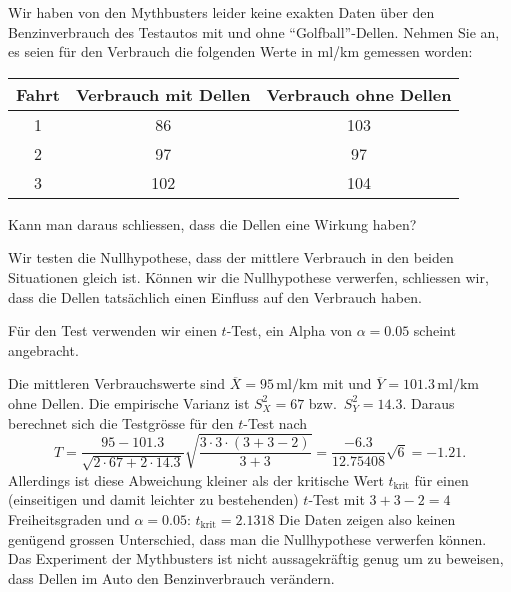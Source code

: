 Wir haben von den Mythbusters leider keine exakten Daten über den
Benzinverbrauch des Testautos mit und ohne ``Golfball''-Dellen.
Nehmen Sie an, es seien für den Verbrauch die folgenden Werte in ml/km
gemessen worden:
\begin{center}
\begin{tabular}{ccc}
\hline
Fahrt&Verbrauch mit Dellen&Verbrauch ohne Dellen\\
\hline
1&86&103\\
2&97&97\\
3&102&104\\
\hline
\end{tabular}
\end{center}
Kann man daraus schliessen, dass die Dellen eine Wirkung haben?


\begin{loesung}
Wir testen die Nullhypothese, dass der mittlere Verbrauch in den
beiden Situationen gleich ist.
Können wir die Nullhypothese verwerfen, schliessen wir, dass die
Dellen tatsächlich einen Einfluss auf den Verbrauch haben.

Für den Test verwenden wir einen $t$-Test, ein Alpha von
$\alpha=0.05$ scheint angebracht.

Die mittleren Verbrauchswerte sind $\overline X=95\,\text{ml/km}$ mit und
$\overline{Y}=101.3\,\text{ml/km}$ ohne Dellen.
Die empirische Varianz ist $S_X^2 = 67$ bzw.~$S_Y^2 = 14.3$.
Daraus berechnet sich die Testgrösse für den $t$-Test nach
\[
T
=
\frac{95-101.3}{\sqrt{2\cdot 67+2\cdot 14.3}}
\sqrt{\frac{3\cdot 3\cdot(3+3-2)}{3+3}}
=
\frac{-6.3}{12.75408}\sqrt{6}
=
-1.21.
\]
Allerdings ist diese Abweichung kleiner als der kritische Wert $t_\text{krit}$
für einen (einseitigen und damit leichter zu bestehenden) $t$-Test mit
$3+3-2=4$ Freiheitsgraden und
$\alpha=0.05$: $t_{\text{krit}}=2.1318$
Die Daten zeigen also keinen genügend grossen Unterschied, dass man die
Nullhypothese verwerfen können.
Das Experiment der Mythbusters ist nicht aussagekräftig genug um zu
beweisen, dass Dellen im Auto den Benzinverbrauch verändern.
\end{loesung}

